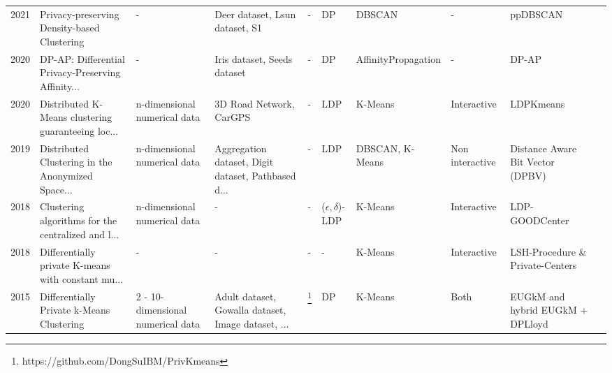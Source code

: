 \begin{landscape}
\begin{table}[ht]
\begin{adjustbox}{width=1.6\textwidth}
\begin{tabular}{rlllllllll}
        2021 \citep{bozdemir_privacy-preserving_nodate} & Privacy-preserving Density-based Clustering        & -                                 & Deer dataset, Lsun dataset, S1                     & -                                                  & DP                       & DBSCAN              & -               & ppDBSCAN                         \\
        2020 \citep{cai_dp-ap_2020}                     & DP-AP: Differential Privacy-Preserving Affinity... & -                                 & Iris dataset, Seeds dataset                        & -                                                  & DP                       & AffinityPropagation & -               & DP-AP                            \\
        2020 \citep{xia_distributed_2020-1}             & Distributed K-Means clustering guaranteeing loc... & n-dimensional numerical data      & 3D Road Network, CarGPS                            & -                                                  & LDP                      & K-Means             & Interactive     & LDPKmeans                        \\
        2019 \citep{sun_distributed_2019}               & Distributed Clustering in the Anonymized Space...  & n-dimensional numerical data      & Aggregation dataset, Digit dataset, Pathbased d... & -                                                  & LDP                      & DBSCAN, K-Means     & Non interactive & Distance Aware Bit Vector (DPBV) \\
        2018 \citep{nissim_clustering_2018}             & Clustering algorithms for the centralized and l... & n-dimensional numerical data      & -                                                  & -                                                  & ($\epsilon, \delta$)-LDP & K-Means             & Interactive     & LDP-GOODCenter                   \\
        2018 \citep{nissim_clustering_2018}             & Differentially private K-means with constant mu... & -                                 & -                                                  & -                                                  & -                        & K-Means             & Interactive     & LSH-Procedure \& Private-Centers \\
        2015 \citep{su_differentially_2015-1}           & Differentially Private k-Means Clustering          & 2 - 10-dimensional numerical data & Adult dataset, Gowalla dataset, Image dataset, ... & \footnote{https://github.com/DongSuIBM/PrivKmeans} & DP                       & K-Means             & Both            & EUGkM and hybrid EUGkM + DPLloyd \\

\end{tabular}
\end{adjustbox}
\end{table}
\end{landscape}
